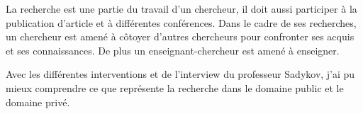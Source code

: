 \documentclass[12pt]{article}
\begin{document}
    La recherche est une partie du travail d'un chercheur, il doit aussi participer à la publication d'article et à
    différentes conférences. Dans le cadre de ses recherches, un chercheur est amené à côtoyer d'autres chercheurs pour
    confronter ses acquis et ses connaissances. De plus un enseignant-chercheur est amené à enseigner.

    Avec les différentes interventions et de l'interview du professeur Sadykov, j'ai pu mieux comprendre ce que
    représente la recherche dans le domaine public et le domaine privé.
\end{document}
